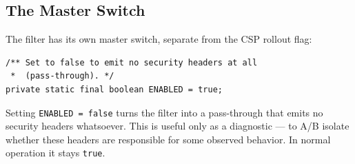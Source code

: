 \subsection{The Master Switch}
\label{sec:security-enabled}

The filter has its own master switch, separate from the CSP rollout flag:

\begin{lstlisting}[style=java]
/** Set to false to emit no security headers at all
 *  (pass-through). */
private static final boolean ENABLED = true;
\end{lstlisting}

\noindent
Setting \texttt{ENABLED = false} turns the filter into a pass-through that emits no security headers whatsoever.  This is useful only as a diagnostic --- to A/B isolate whether these headers are responsible for some observed behavior.  In normal operation it stays \texttt{true}.
